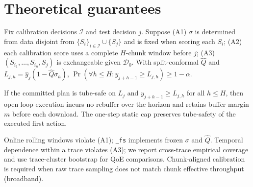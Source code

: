 \section{Theoretical guarantees}
\label{sec:theory}

\begin{theorem}
\label{thm:maxscore}
Fix calibration decisions \(\mathcal I\) and test decision \(j\).
Suppose (A1) \(\sigma\) is determined from data disjoint from \(\{S_i\}_{i\in\mathcal I}\cup\{S_j\}\) and is fixed when scoring each \(S_i\);
(A2) each calibration score uses a complete \(H\)-chunk window before \(j\);
(A3) \((S_{i_1},\ldots,S_{i_n},S_j)\) is exchangeable given \(\mathcal D_0\).
With split-conformal \(\widehat Q\) and \(L_{j,h}=\hat y_j(1-\widehat Q\sigma_h)\),
\(\Pr(\forall h\le H: y_{j+h-1}\ge L_{j,h}) \ge 1-\alpha\).
\end{theorem}

\begin{lemma}
\label{lem:safety}
If the committed plan is tube-safe on \(L_j\) and \(y_{j+h-1}\ge L_{j,h}\) for all \(h\le H\), then open-loop execution incurs no rebuffer over the horizon and retains buffer margin \(m\) before each download.
The one-step static cap preserves tube-safety of the executed first action.
\end{lemma}

\begin{remark}[Practice]
Online rolling windows violate (A1); \texttt{\_fs} implements frozen \(\sigma\) and \(\widehat Q\).
Temporal dependence within a trace violates (A3); we report cross-trace empirical coverage and use trace-cluster bootstrap for QoE comparisons.
Chunk-aligned calibration is required when raw trace sampling does not match chunk effective throughput (broadband).
\end{remark}
